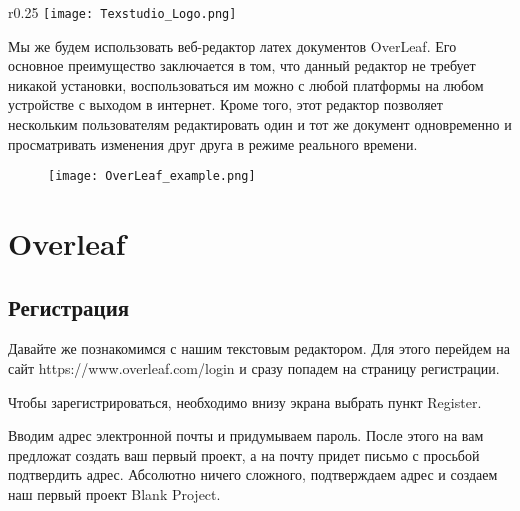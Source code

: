     \begin{wrapfigure}{r}{0.25\textwidth}
        \centering
        \texttt{[image: Texstudio\_Logo.png]}
        \caption{}
    \end{wrapfigure}



    Мы же будем использовать веб-редактор латех документов OverLeaf. Его основное преимущество заключается в том, что данный редактор не требует никакой установки, воспользоваться им можно с любой платформы на любом устройстве с выходом в интернет.
    Кроме того, этот редактор позволяет нескольким пользователям редактировать один и тот же документ одновременно и просматривать изменения друг друга в режиме реального времени.

    \begin{figure}[h!]
        \centering
        \texttt{[image: OverLeaf\_example.png]}
        \caption{}
        \label{OverLeaf_example}
    \end{figure}

    \section{Overleaf}

    \subsection{Регистрация}

    Давайте же познакомимся с нашим текстовым редактором. Для этого перейдем на сайт 
    https://www.overleaf.com/login и сразу попадем на страницу регистрации. 

    
    Чтобы зарегистрироваться, необходимо внизу экрана выбрать пункт Register.


    Вводим адрес электронной почты и придумываем пароль. После этого на вам предложат создать ваш первый проект, а на почту придет письмо с просьбой подтвердить адрес. Абсолютно ничего сложного,
    подтверждаем адрес и создаем наш первый проект Blank Project.


